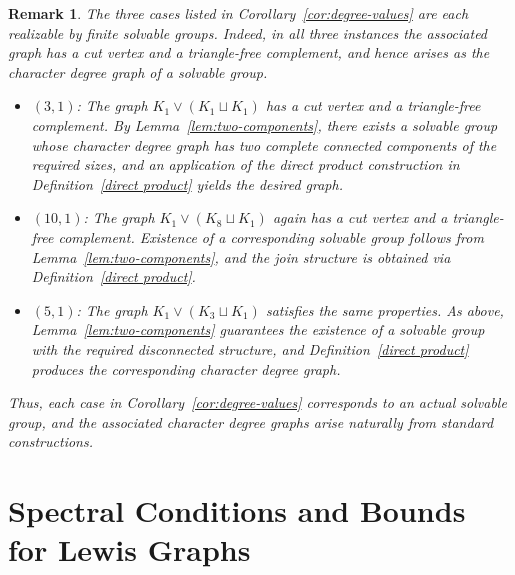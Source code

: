 \documentclass[11pt]{amsart}
\newtheorem{rem}[thm]{\bf Remark}
\begin{document}
\begin{rem}\label{rem:existence-cases}
The three cases listed in Corollary~\ref{cor:degree-values} are each realizable by finite solvable groups. Indeed, in all three instances the associated graph has a cut vertex and a triangle-free complement, and hence arises as the character degree graph of a solvable group.
\begin{itemize}
    \item $(3,1)$: The graph $K_1 \vee (K_1 \sqcup K_1)$ has a cut vertex and a triangle-free complement.  
    By Lemma~\ref{lem:two-components}, there exists a solvable group whose character degree graph has two complete connected components of the required sizes, and an application of the direct product construction in Definition~\ref{direct product} yields the desired graph.
    \item $(10,1)$: The graph $K_1 \vee (K_8 \sqcup K_1)$ again has a cut vertex and a triangle-free complement.  
    Existence of a corresponding solvable group follows from Lemma~\ref{lem:two-components}, and the join structure is obtained via Definition~\ref{direct product}.
    \item $(5,1)$: The graph $K_1 \vee (K_3 \sqcup K_1)$ satisfies the same properties.  
    As above, Lemma~\ref{lem:two-components} guarantees the existence of a solvable group with the required disconnected structure, and Definition~\ref{direct product} produces the corresponding character degree graph.
\end{itemize}

Thus, each case in Corollary~\ref{cor:degree-values} corresponds to an actual solvable group, and the associated character degree graphs arise naturally from standard constructions.
\end{rem}

 
\section{Spectral Conditions and Bounds for Lewis Graphs}
\end{document}

